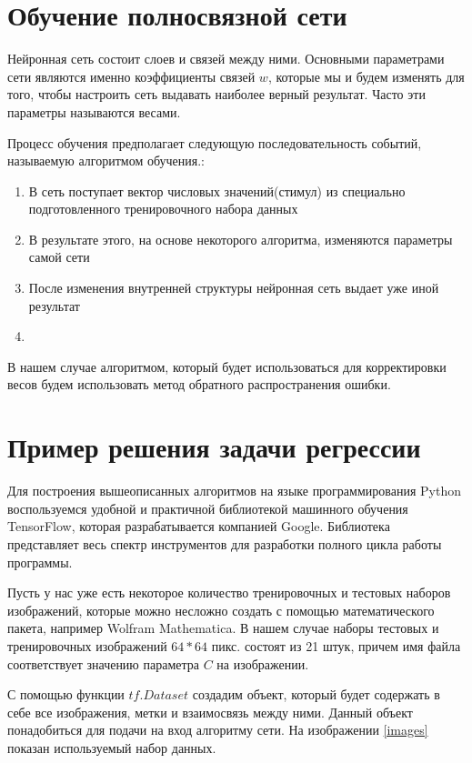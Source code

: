 \documentclass[12pt, a4paper]{article}
\begin{document}
	
	
	\section{Обучение полносвязной сети}
	
	Нейронная сеть состоит слоев и связей между ними. Основными параметрами сети являются именно коэффициенты связей $w$, которые мы и будем изменять для того, чтобы настроить сеть выдавать наиболее верный результат. Часто эти параметры называются весами.
	
	Процесс обучения предполагает следующую последовательность событий, называемую алгоритмом обучения\cite[см. стр.~87]{2}.:
	
	\begin{enumerate}
		\item В сеть поступает вектор числовых значений(стимул) из специально подготовленного тренировочного набора данных
		\item В результате этого, на основе некоторого алгоритма, изменяются параметры самой сети
		\item После изменения внутренней структуры нейронная сеть выдает уже иной результат
		\item
	\end{enumerate}
	
	В нашем случае алгоритмом, который будет использоваться для корректировки весов будем использовать метод обратного распространения ошибки.
	
	\section{Пример решения задачи регрессии}
	Для построения вышеописанных алгоритмов на языке программирования Python воспользуемся удобной и практичной библиотекой машинного обучения TensorFlow, которая разрабатывается компанией Google. Библиотека представляет весь спектр инструментов для разработки полного цикла работы программы. 
	
	Пусть у нас уже есть некоторое количество тренировочных и тестовых наборов изображений, которые можно несложно создать с помощью математического пакета, например Wolfram Mathematica. В нашем случае наборы тестовых и тренировочных изображений $64*64$ пикс. состоят из 21 штук, причем имя файла соответствует значению параметра $C$ на изображении.
	
	С помощью функции $tf.Dataset$ создадим объект, который будет содержать в себе все изображения, метки и взаимосвязь между ними. Данный объект понадобиться для подачи на вход алгоритму сети. На изображении \ref{images} показан используемый набор данных.
	
\end{document}

